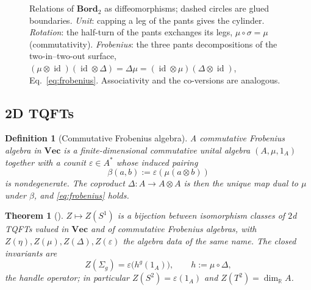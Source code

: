 \documentclass[prl,aps,10pt,superscriptaddress, floatfix]{revtex4-2}
\newtheorem{theo}{Theorem}
\newtheorem*{defi}{Definition}
\begin{document}
\begin{figure}[t]
\caption{Relations of $\mathbf{Bord}_2$ as diffeomorphisms; dashed circles are glued boundaries. \emph{Unit}: capping a leg of the pants gives the cylinder. \emph{Rotation}: the half-turn of the pants exchanges its legs, $\mu\circ\sigma=\mu$ (commutativity). \emph{Frobenius}: the three pants decompositions of the two-in--two-out surface, $(\mu\otimes\operatorname{id})(\operatorname{id}\otimes\Delta)=\Delta\mu=(\operatorname{id}\otimes\mu)(\Delta\otimes\operatorname{id})$, Eq.~\eqref{eq:frobenius}. Associativity and the co-versions are analogous.}
\label{fig:frobrel}
\end{figure}

\subsection{2D TQFTs}

\begin{defi}[Commutative Frobenius algebra]
A \emph{commutative Frobenius algebra} in $\mathbf{Vec}$ is a finite-dimensional commutative unital algebra $(A,\mu,1_A)$ together with a \emph{counit} $\varepsilon\in A^*$ whose induced pairing
\[
\beta(a,b):=\varepsilon(\mu(a\otimes b))
\]
is nondegenerate. The coproduct $\Delta:A\to A\otimes A$ is then the unique map dual to $\mu$ under $\beta$, and \eqref{eq:frobenius} holds.
\end{defi}

\begin{theo}[\cite{Dijkgraaf1989,Abrams1996}]\label{theo:2dclass}
$Z\mapsto Z(S^1)$ is a bijection between isomorphism classes of $2$d TQFTs valued in $\mathbf{Vec}$ and of commutative Frobenius algebras, with $Z(\eta),Z(\mu),Z(\Delta),Z(\varepsilon)$ the algebra data of the same name. The closed invariants are
\[
Z(\Sigma_g)=\varepsilon\big(h^g(1_A)\big),\qquad h:=\mu\circ\Delta,
\]
the \emph{handle operator}; in particular $Z(S^2)=\varepsilon(1_A)$ and $Z(T^2)=\dim_{\mathbb R}A$.
\end{theo}
\end{document}
